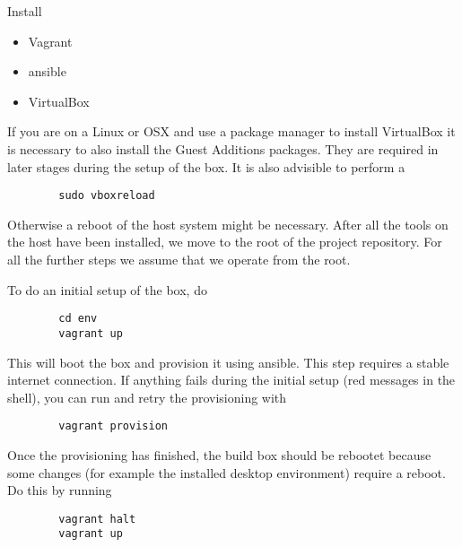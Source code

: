 Install

\begin{itemize}
    \item Vagrant
    \item ansible
    \item VirtualBox
\end{itemize}

If you are on  a Linux or OSX and use a package  manager to install VirtualBox
it  is  necessary to  also  install  the  Guest Additions  packages. They  are
required in later stages during the setup of the box.
It is also advisible to perform a

\begin{listing}
    \begin{verbatim}
        sudo vboxreload
    \end{verbatim}
\end{listing}

Otherwise a reboot of the host system might be necessary.
After all the  tools on the host have  been installed, we move to  the root of
the project  repository. For all the further  steps we assume that  we operate
from the root.

To do an initial setup of the box, do

\begin{listing}
    \begin{verbatim}
        cd env
        vagrant up
    \end{verbatim}
\end{listing}

This will  boot the box and  provision it using ansible. This  step requires a
stable internet  connection. If anything fails  during the initial  setup (red
messages in the shell), you can run and retry the provisioning with

\begin{listing}
    \begin{verbatim}
        vagrant provision
    \end{verbatim}
\end{listing}

Once the provisioning  has finished, the build box should  be rebootet because
some  changes  (for  example  the installed  desktop  environment)  require  a
reboot. Do this by running

\begin{listing}
    \begin{verbatim}
        vagrant halt
        vagrant up
    \end{verbatim}
\end{listing}

